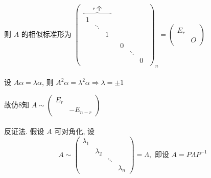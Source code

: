          则 \( A \) 的相似标准形为 \( \begin{pmatrix}
             \overbrace{\begin{matrix}
                                1 &        &   \\
                                  & \ddots &   \\
                                  &        & 1
                            \end{matrix}}^{r \text{ 个}} &     \\
                                         & \begin{matrix}
                                               0 &        &   \\
                                                 & \ddots &   \\
                                                 &        & 0
                                           \end{matrix}
         \end{pmatrix}_{n} = \begin{pmatrix}
             E_{r} &   \\
                   & O
         \end{pmatrix} \)


     \paragraph{} %
         设 \( A\alpha = \lambda\alpha \), 则 \( A^{2}\alpha = \lambda^{2}\alpha \Rightarrow \lambda = \pm 1 \)

         故仿8知 \( A \sim \begin{pmatrix}
             E_{r} &          \\
                   & -E_{n-r}
         \end{pmatrix} \)


     \paragraph{} %
         反证法. 假设 \( A \) 可对角化, 设
         \[ A \sim \begin{pmatrix}
                 \lambda_{1} &             &                      \\
                             & \lambda_{2} &                      \\
                             &             & \ddots &             \\
                             &             &        & \lambda_{n}
             \end{pmatrix} = \Lambda, \text{ 即设 } A = P\Lambda P^{-1} \]

